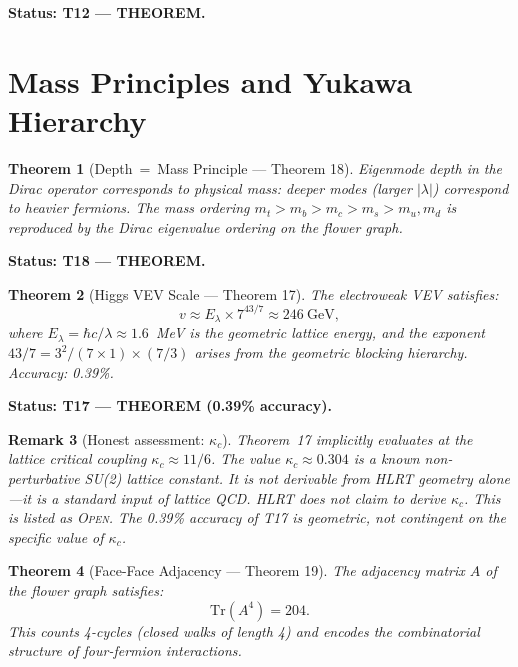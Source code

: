 \documentclass[11pt,letterpaper]{article}
\newtheorem{theorem}{Theorem}[section]
\newtheorem{remark}[theorem]{Remark}
\begin{document}
\textbf{Status: T12 --- THEOREM.}

\section{Mass Principles and Yukawa Hierarchy}

\begin{theorem}[Depth~=~Mass Principle --- Theorem 18]\label{thm:T18}
Eigenmode depth in the Dirac operator corresponds to physical mass:
deeper modes (larger $|\lambda|$) correspond to heavier fermions.
The mass ordering $m_t > m_b > m_c > m_s > m_u, m_d$ is reproduced
by the Dirac eigenvalue ordering on the flower graph.
\end{theorem}

\textbf{Status: T18 --- THEOREM.}

\begin{theorem}[Higgs VEV Scale --- Theorem 17]\label{thm:T17}
The electroweak VEV satisfies:
\begin{equation}
  v \approx E_\lambda \times 7^{43/7} \approx 246~\text{GeV},
\end{equation}
where $E_\lambda = \hbar c/\lambda \approx 1.6$~MeV is the geometric lattice
energy, and the exponent $43/7 = 3^2/(7\times1) \times (7/3)$ arises from
the geometric blocking hierarchy.  Accuracy: 0.39\%.
\end{theorem}

\textbf{Status: T17 --- THEOREM (0.39\% accuracy).}

\begin{remark}[Honest assessment: $\kappa_c$]
Theorem~17 implicitly evaluates at the lattice critical coupling
$\kappa_c \approx 11/6$.  The value $\kappa_c\approx0.304$ is a known
non-perturbative SU(2) lattice constant.  It is \emph{not} derivable from
HLRT geometry alone---it is a standard input of lattice QCD.  HLRT does not
claim to derive $\kappa_c$.  This is listed as \textsc{Open}.  The 0.39\%
accuracy of T17 is geometric, not contingent on the specific value of
$\kappa_c$.
\end{remark}

\begin{theorem}[Face-Face Adjacency --- Theorem 19]\label{thm:T19}
The adjacency matrix $A$ of the flower graph satisfies:
\begin{equation}
  \mathrm{Tr}(A^4) = 204.
\end{equation}
This counts 4-cycles (closed walks of length 4) and encodes the
combinatorial structure of four-fermion interactions.
\end{theorem}
\end{document}
